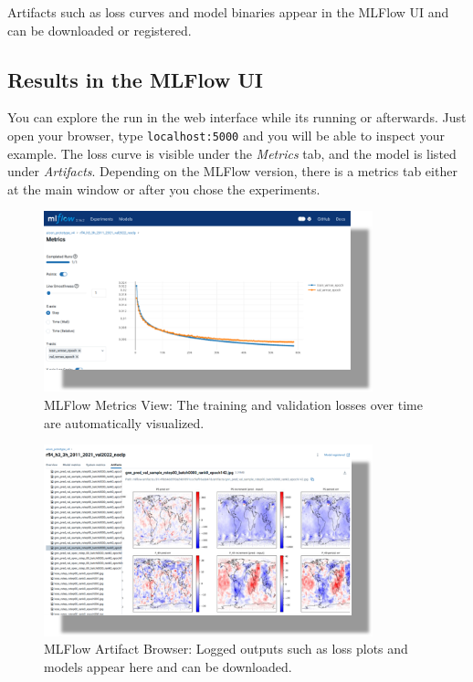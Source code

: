 Artifacts such as loss curves and model binaries appear in the MLFlow UI and can be downloaded or registered.

%
\subsection{Results in the MLFlow UI}

You can explore the run in the web interface while its running or afterwards. Just open your browser, type \texttt{localhost:5000} and you will be able to inspect your example. The loss curve is visible under the \textit{Metrics} tab, and the model is listed under \textit{Artifacts}. Depending on the MLFlow version, there is a metrics tab either at the main window or after you chose the experiments.

\begin{figure}[htbp]
    \centering
    \includegraphics[width=0.85\textwidth]{images/mlflow01.png}
    \caption{MLFlow Metrics View: The training and validation losses over time are automatically visualized.}
    \label{fig:mlflow_metrics_2}
\end{figure}

\begin{figure}[htbp]
    \centering
    \includegraphics[width=0.85\textwidth]{images/mlflow02.png}
    \caption{MLFlow Artifact Browser: Logged outputs such as loss plots and models appear here and can be downloaded.}
    \label{fig:mlflow_artifacts_2}
\end{figure}


